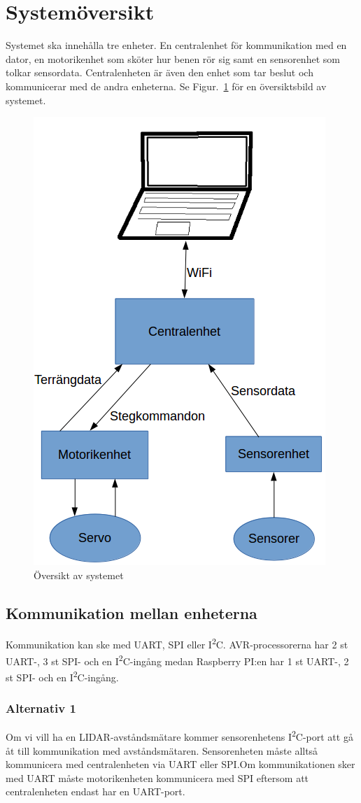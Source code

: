 \documentclass[a4paper,titlepage,12pt]{article}
\newcommand{\itc}{I\textsuperscript{2}C}
\begin{document}
	\section{Systemöversikt}
	Systemet ska innehålla tre enheter. En centralenhet för kommunikation med en
	dator, en motorikenhet som sköter hur benen rör sig samt en sensorenhet som
	tolkar sensordata. Centralenheten är även den enhet som tar beslut och
	kommunicerar med de andra enheterna. Se Figur.~\ref{fig:overview} för en översiktsbild av
	systemet.
	\begin{figure}[h]
		\centering
		\includegraphics[width=0.5\linewidth]{../images/overview.png}
		\caption{Översikt av systemet\label{fig:overview}}
	\end{figure}

	\subsection{Kommunikation mellan enheterna}
	Kommunikation kan ske med UART, SPI eller \itc{}. AVR-processorerna har
	2 st UART-, 3 st SPI- och en \itc{}-ingång medan Raspberry PI:en har 1 st
    UART-, 2 st SPI- och
	en \itc{}-ingång. 

	\subsubsection{Alternativ 1}
	Om vi vill ha en LIDAR-avståndsmätare kommer sensorenhetens \itc{}-port att gå åt
	till kommunikation med avståndsmätaren. Sensorenheten måste alltså kommunicera med
	centralenheten via UART eller SPI.\@ Om kommunikationen sker med UART måste 
	motorikenheten kommunicera med SPI eftersom att centralenheten endast har en
	UART-port.
\end{document}
